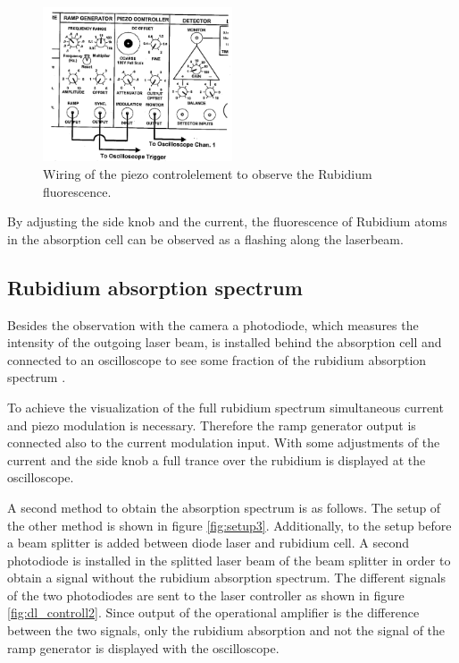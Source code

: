 \begin{figure}
  \centering
  \includegraphics[width=0.5\textwidth]{wiring.png}
  \caption{Wiring of the piezo controlelement to observe the Rubidium fluorescence.\cite{V60}}
  \label{fig:dl_controll}
\end{figure}

By adjusting the side knob and the current,
the fluorescence of Rubidium atoms in the absorption cell
can be observed
as a  flashing along the laserbeam.

\subsection{Rubidium absorption spectrum}
\label{subsec:rubidium_absorption spectrum}

Besides the observation with the camera a photodiode,
which measures the intensity
of the outgoing laser beam,
is installed behind the absorption cell and
connected to an oscilloscope to
see some fraction of the rubidium absorption spectrum .

To achieve the visualization of the full rubidium
spectrum
simultaneous current and piezo modulation
is necessary. Therefore the ramp generator output
is connected also to the current modulation input.
With some adjustments of the current and the side knob
a full trance over the rubidium is displayed at the oscilloscope.

A second method to obtain the absorption spectrum
is as follows.
The setup of the other method is shown in
figure \ref{fig:setup3}.
Additionally, to the setup before a beam splitter is added
between diode laser and rubidium cell.
A second photodiode is installed in the splitted laser beam of the beam splitter
in order to obtain a signal without the rubidium absorption spectrum.
The different signals of the two photodiodes are sent to the
laser controller as shown in figure \ref{fig:dl_controll2}.
Since output of the operational amplifier is
the  difference between the two signals,
only the rubidium absorption and not the signal of the ramp generator is
displayed with the oscilloscope.

